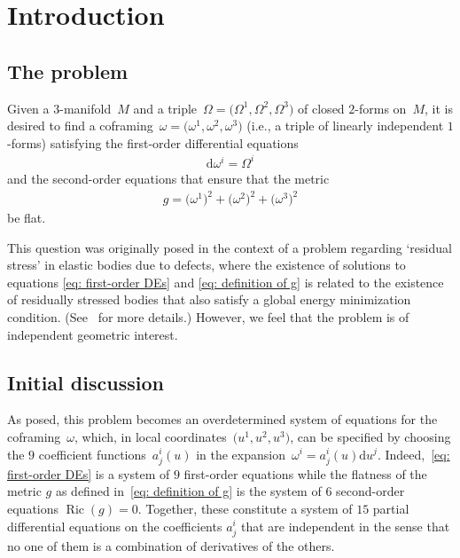 \documentclass[pdftex]{sigma}
\numberwithin{equation}{section}
\renewcommand{\d}{\mathrm{d}}%
\newcommand{\Ric}{\operatorname{Ric}}
\begin{document}

\section{Introduction}\label{sec: intro}

\subsection{The problem} Given a $3$-manifold~$M$
and a triple~$\Omega = \big(\Omega^1,\Omega^2,\Omega^3\big)$
of closed $2$-forms on~$M$,
it is desired to find a coframing~$\omega = \big(\omega^1,\omega^2,\omega^3\big)$
(i.e., a triple of linearly independent $1$-forms)
satisfying the first-order differential equations
\begin{gather}\label{eq: first-order DEs}
\d\omega^i = \Omega^i
\end{gather}
and the second-order equations that ensure that the metric
\begin{gather}\label{eq: definition of g}
g = \big(\omega^1\big)^2+\big(\omega^2\big)^2+\big(\omega^3\big)^2
\end{gather}
be flat.

This question was originally posed in the context of a problem regarding `residual stress' in elastic bodies due to defects, where the existence of solutions to equations \eqref{eq: first-order DEs} and \eqref{eq: definition of g} is related to the existence of residually stressed bodies that also satisfy a global energy minimization condition. (See~\cite{Acharya} for more details.) However, we feel that the problem is of independent geometric interest.

\subsection{Initial discussion}
As posed, this problem becomes an overdetermined system
of equations for the coframing~$\omega$,
which, in local coordinates~$\big(u^1,u^2,u^3\big)$, can be specified
by choosing the $9$ coefficient functions~$a^i_j(u)$
in the expansion~$\omega^i = a^i_j(u) \d u^j$.
Indeed,~\eqref{eq: first-order DEs}
is a system of $9$ first-order equations
while the flatness of the metric $g$
as defined in~\eqref{eq: definition of g}
is the system of $6$ second-order equations $\Ric(g) = 0$.
Together, these constitute a system of $15$
partial differential equations on the coefficients $a^i_j$
that are independent in the sense that no one of them is a combination of derivatives of the others.
\end{document}
